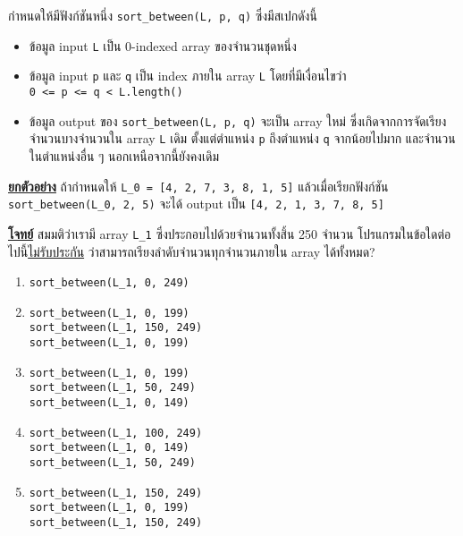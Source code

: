 \question{\label{q:quickfire_central_audition_sortbetweenintro}}

กำหนดให้มีฟังก์ชันหนึ่ง \lstinline{sort_between(L, p, q)}    ซึ่งมีสเปกดังนี้ 
\begin{itemize}
    \item ข้อมูล input \lstinline{L} เป็น 0-indexed array ของจำนวนชุดหนึ่ง
    \item ข้อมูล input \lstinline{p} และ \lstinline{q} เป็น index 
        ภายใน array \lstinline{L} โดยที่มีเงื่อนไขว่า \\
        \lstinline{0 <= p <= q < L.length()}
    \item ข้อมูล output ของ \lstinline{sort_between(L, p, q)} 
        จะเป็น array ใหม่ ซึ่งเกิดจากการจัดเรียงจำนวนบางจำนวนใน array \lstinline{L} เดิม 
        ตั้งแต่ตำแหน่ง \lstinline{p} ถึงตำแหน่ง \lstinline{q} จากน้อยไปมาก
        และจำนวนในตำแหน่งอื่น ๆ นอกเหนือจากนี้ยังคงเดิม
\end{itemize}

\noindent
\textbf{\uline{ยกตัวอย่าง}}\; ถ้ากำหนดให้ \lstinline{L_0 = [4, 2, 7, 3, 8, 1, 5]}
แล้วเมื่อเรียกฟังก์ชัน \lstinline{sort_between(L_0, 2, 5)}  
จะได้ output เป็น \lstinline{[4, 2, 1, 3, 7, 8, 5]}

\medskip\noindent
\textbf{\uline{โจทย์}}\; สมมติว่าเรามี array \lstinline{L_1} 
ซึ่งประกอบไปด้วยจำนวนทั้งสิ้น 250 จำนวน โปรแกรมในข้อใดต่อไปนี้\hrsp\uline{ไม่รับประกัน}\hrsp%
ว่าสามารถเรียงลำดับจำนวนทุกจำนวนภายใน array ได้ทั้งหมด?
\begin{enumerate}[label={$\Circle$}]
\item \lstinline{sort_between(L_1, 0, 249)}
\item
    \lstinline{sort_between(L_1, 0, 199)} \\
    \lstinline{sort_between(L_1, 150, 249)} \\
    \lstinline{sort_between(L_1, 0, 199)}
\item 
    \lstinline{sort_between(L_1, 0, 199)} \\
    \lstinline{sort_between(L_1, 50, 249)} \\
    \lstinline{sort_between(L_1, 0, 149)}
\item 
    \lstinline{sort_between(L_1, 100, 249)} \\
    \lstinline{sort_between(L_1, 0, 149)} \\
    \lstinline{sort_between(L_1, 50, 249)}
\item 
    \lstinline{sort_between(L_1, 150, 249)} \\
    \lstinline{sort_between(L_1, 0, 199)} \\
    \lstinline{sort_between(L_1, 150, 249)}
\end{enumerate}
